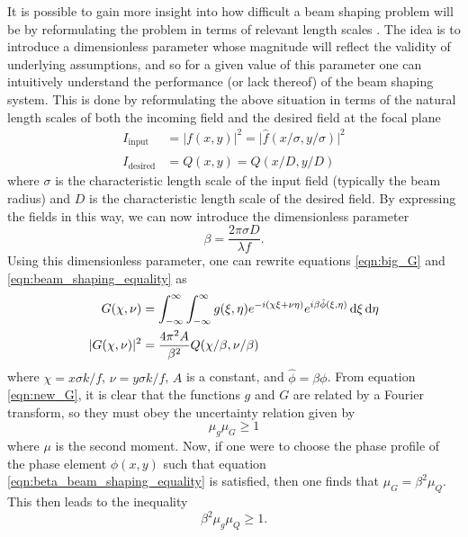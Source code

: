 It is possible to gain more insight into how difficult a beam shaping problem will be by reformulating the problem in terms of relevant length scales \cite{dickeyLaserBeamShaping2000,romeroMathematicalAspectsLaser2010}.  The idea is to introduce a dimensionless parameter whose magnitude will reflect the validity of underlying assumptions, and so for a given value of this parameter one can intuitively understand the performance (or lack thereof) of the beam shaping system.  This is done by reformulating the above situation in terms of the natural length scales of both the incoming field and the desired field at the focal plane
\begin{align}
	I_{\mathrm{input}} &= \rvert f(x,y)\rvert^2=\rvert\hat{f}(x/\sigma,y/\sigma)\rvert^2\\
	I_{\mathrm{desired}} &= Q(x,y)=\hat{Q}(x/D,y/D)
\end{align}
where $\sigma$ is the characteristic length scale of the input field (typically the beam radius) and $D$ is the characteristic length scale of the desired field.  By expressing the fields in this way, we can now introduce the dimensionless parameter
\begin{equation}
\label{eqn:beta_parameter}
	\beta=\frac{2\pi\sigma D}{\lambda f}.
\end{equation}
Using this dimensionless parameter, one can rewrite equations \ref{eqn:big_G} and \ref{eqn:beam_shaping_equality} as
\begin{align}
\label{eqn:new_G}
	G(\chi,\nu) &= \int_{-\infty}^{\infty}\int_{-\infty}^{\infty} g(\xi,\eta)e^{-i(\chi\xi+\nu\eta)}e^{i\beta\hat{\phi}(\xi,\eta)} \mathop{}\!\mathrm{d}\xi\mathop{}\!\mathrm{d}\eta\\
\label{eqn:beta_beam_shaping_equality}
	\rvert G(\chi, \nu)\rvert^2 &= \frac{4\pi^2 A}{\beta^2}Q(\chi/\beta,\nu/\beta)
\end{align}
where $\chi=x\sigma k /f$, $\nu=y\sigma k /f$, $A$ is a constant, and $\hat{\phi} = \beta\phi$. From equation \ref{eqn:new_G}, it is clear that the functions $g$ and $G$ are related by a Fourier transform, so they must obey the uncertainty relation given by
\begin{equation}
	\mu_g \mu_G\geq 1
\end{equation}
where $\mu$ is the second moment.  Now, if one were to choose the phase profile of the phase element $\phi(x,y)$ such that equation \ref{eqn:beta_beam_shaping_equality} is satisfied, then one finds that $\mu_G=\beta^2\mu_Q$.  This then leads to the inequality
\begin{equation}
\label{eqn:beta_inequalty}
	\beta^2 \mu_g\mu_Q\geq 1.
\end{equation}
